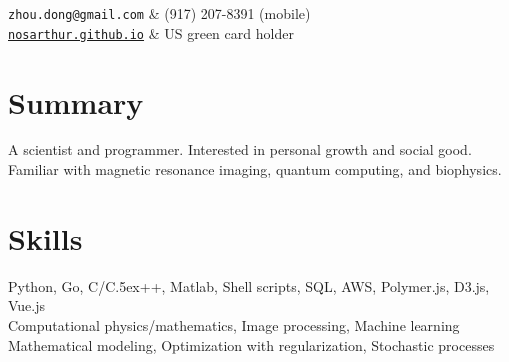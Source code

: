 \documentclass[centered,11pt,overlapped]{res}
\def\Cplusplus{{\rm C\raise.5ex\hbox{\small ++}}}
\begin{document}


\begin{resume}

\begin{ncolumn}{2}
   {\tt zhou.dong@gmail.com} &  (917) 207-8391 (mobile) \\
   {\tt \href{nosarthur.github.io}{nosarthur.github.io}} &  US green card holder
\end{ncolumn}


\section{\sc Summary}
A scientist and programmer. 
Interested in personal growth and social good.
Familiar with magnetic resonance imaging, quantum computing, and biophysics.



\section{\sc Skills}
Python, Go, C/\Cplusplus, Matlab, Shell scripts, SQL, AWS, Polymer.js, D3.js, Vue.js\\
Computational physics/mathematics, Image processing, Machine learning\\
Mathematical modeling, Optimization with regularization, Stochastic processes 



\end{resume}
\end{document}
